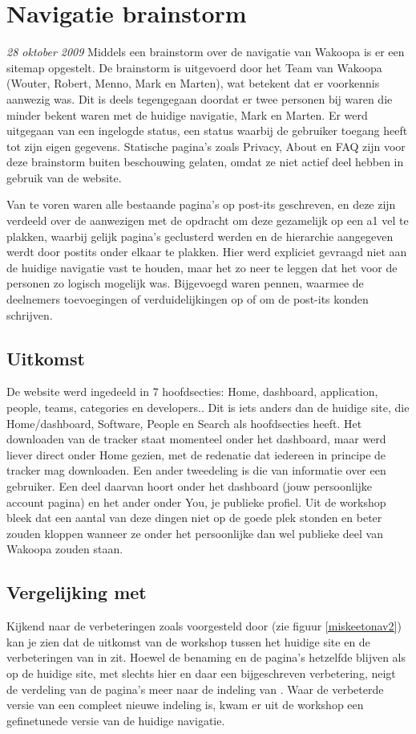 \chapter{Navigatie brainstorm}
\textit{28 oktober 2009} Middels een brainstorm over de navigatie van Wakoopa is er een sitemap opgestelt. De brainstorm is uitgevoerd door het Team van Wakoopa (Wouter, Robert, Menno, Mark en Marten), wat betekent dat er voorkennis aanwezig was. Dit is deels tegengegaan doordat er twee personen bij waren die minder bekent waren met de huidige navigatie, Mark en Marten. Er werd uitgegaan van een ingelogde status, een status waarbij de gebruiker toegang heeft tot zijn eigen gegevens. Statische pagina's zoals Privacy, About en FAQ zijn voor deze brainstorm buiten beschouwing gelaten, omdat ze niet actief deel hebben in gebruik van de website.

Van te voren waren alle bestaande pagina's op post-its geschreven, en deze zijn verdeeld over de aanwezigen met de opdracht om deze gezamelijk op een a1 vel te plakken, waarbij gelijk pagina's geclusterd werden en de hierarchie aangegeven werdt door postits onder elkaar te plakken. Hier werd expliciet gevraagd niet aan de huidige navigatie vast te houden, maar het zo neer te leggen dat het voor de personen zo logisch mogelijk was. Bijgevoegd waren pennen, waarmee de deelnemers toevoegingen of verduidelijkingen op of om de post-its konden schrijven.

\section*{Uitkomst}
De website werd ingedeeld in 7 hoofdsecties: Home, dashboard, application, people, teams, categories en developers.. Dit is iets anders dan de huidige site, die Home/dashboard, Software, People en Search als hoofdsecties heeft. Het downloaden van de tracker staat momenteel onder het dashboard, maar werd liever direct onder Home gezien, met de redenatie dat iedereen in principe de tracker mag downloaden. Een ander tweedeling is die van informatie over een gebruiker. Een deel daarvan hoort onder het dashboard (jouw persoonlijke account pagina) en het ander onder You, je publieke profiel. Uit de workshop bleek dat een aantal van deze dingen niet op de goede plek stonden en beter zouden kloppen wanneer ze onder het persoonlijke dan wel publieke deel van Wakoopa zouden staan.
\section*{Vergelijking met \citeauthor{Hoekman2008}}
Kijkend naar de verbeteringen zoals voorgesteld door \citeauthor{Hoekman2008} (zie figuur \ref{miskeetonav2}) kan je zien dat de uitkomst van de workshop tussen het huidige site en de verbeteringen van \citeauthor{Hoekman2008} in zit. Hoewel de benaming en de pagina's hetzelfde blijven als op de huidige site, met slechts hier en daar een bijgeschreven verbetering, neigt de verdeling van de pagina's meer naar de indeling van \citeauthor{Hoekman2008}. Waar de verbeterde versie van \citeauthor{Hoekman2008} een compleet nieuwe indeling is, kwam er uit de workshop een gefinetunede versie van de huidige navigatie.

